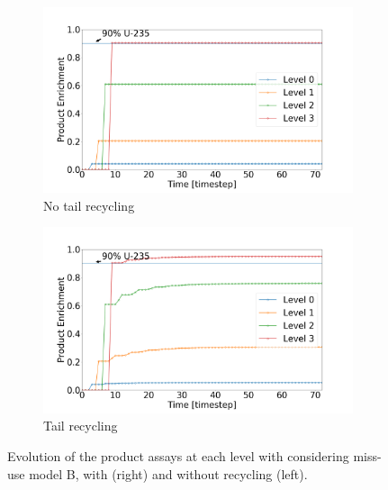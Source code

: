 \begin{figure}[t!]
    \centering
    \begin{subfigure}[t]{0.45\textwidth}
        \centering
        \includegraphics[scale=0.18]{NR_case2}
        \caption{No tail recycling}
    \end{subfigure}%
    \begin{subfigure}[t]{0.45\textwidth}
        \centering
        \includegraphics[scale=0.18]{R_case2}
        \caption{Tail recycling}
    \end{subfigure}
    \caption{Evolution of the product assays at each level with considering
    miss-use model B, with (right) and without recycling (left).}
    \label{fig:case2}
\end{figure}

